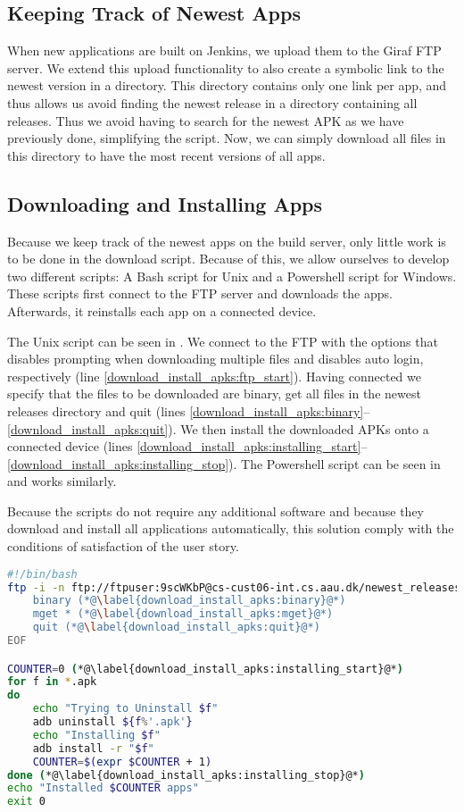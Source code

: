 \subsection{Keeping Track of Newest Apps}
When new applications are built on Jenkins, we upload them to the Giraf FTP server. We extend this upload functionality to also create a symbolic link to the newest version in a  directory. This directory contains only one link per app, and thus allows us avoid finding the newest release in a directory containing all releases. Thus we avoid having to search for the newest APK as we have previously done, simplifying the script. Now, we can simply download all files in this directory to have the most recent versions of all apps.

\subsection{Downloading and Installing Apps}
Because we keep track of the newest apps on the build server, only little work is to be done in the download script. Because of this, we allow ourselves to develop two different scripts: A Bash script for Unix and a Powershell script for Windows. These scripts first connect to the FTP server and downloads the apps. Afterwards, it reinstalls each app on a connected device.

The Unix script can be seen in . We connect to the FTP with the  options that disables prompting when downloading multiple files and disables auto login, respectively (line \ref{download_install_apks:ftp_start}). Having connected we specify that the files to be downloaded are binary, get all files in the newest releases directory and quit (lines \ref{download_install_apks:binary}--\ref{download_install_apks:quit}). We then install the downloaded APKs onto a connected device (lines \ref{download_install_apks:installing_start}--\ref{download_install_apks:installing_stop}). The Powershell script can be seen in  and works similarly.

Because the scripts do not require any additional software and because they download and install all applications automatically, this solution comply with the conditions of satisfaction of the user story.

\begin{lstlisting}[language=bash,caption=Unix script that downloads and installs newest APKs,label=lst:download_install_apks_unix]
#!/bin/bash
ftp -i -n ftp://ftpuser:9scWKbP@cs-cust06-int.cs.aau.dk/newest_releases/ << EOF (*@\label{download_install_apks:ftp_start}@*)
    binary (*@\label{download_install_apks:binary}@*)
    mget * (*@\label{download_install_apks:mget}@*)
    quit (*@\label{download_install_apks:quit}@*)
EOF

COUNTER=0 (*@\label{download_install_apks:installing_start}@*)
for f in *.apk
do
    echo "Trying to Uninstall $f"
    adb uninstall ${f%'.apk'}
    echo "Installing $f"
    adb install -r "$f"
    COUNTER=$(expr $COUNTER + 1)
done (*@\label{download_install_apks:installing_stop}@*)
echo "Installed $COUNTER apps"
exit 0
\end{lstlisting}

